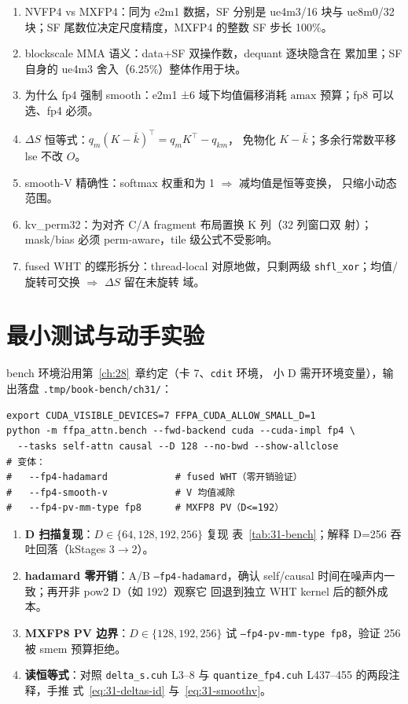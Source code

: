 \begin{enumerate}[itemsep=2pt,topsep=2pt]
  \item NVFP4 vs MXFP4：同为 e2m1 数据，SF 分别是 ue4m3/16 块与
        ue8m0/32 块；SF 尾数位决定尺度精度，MXFP4 的整数 SF 步长
        100\%。
  \item blockscale MMA 语义：data+SF 双操作数，dequant 逐块隐含在
        累加里；SF 自身的 ue4m3 舍入（6.25\%）整体作用于块。
  \item 为什么 fp4 强制 smooth：e2m1 ±6 域下均值偏移消耗
        $\mathrm{amax}$ 预算；fp8 可以选、fp4 必须。
  \item $\Delta S$ 恒等式：$q_m(K-\bar k)^\top=q_mK^\top-q_{km}$，
        免物化 $K-\bar k$；多余行常数平移 lse 不改 $O$。
  \item smooth-V 精确性：softmax 权重和为 1 $\Rightarrow$ 减均值是恒等变换，
        只缩小动态范围。
  \item kv\_perm32：为对齐 C/A fragment 布局置换 K 列（32 列窗口双
        射）；mask/bias 必须 perm-aware，tile 级公式不受影响。
  \item fused WHT 的蝶形拆分：thread-local 对原地做，只剩两级
        \texttt{shfl\_xor}；均值/旋转可交换 $\Rightarrow$ $\Delta S$ 留在未旋转
        域。
\end{enumerate}

\section{最小测试与动手实验}

bench 环境沿用第~\ref{ch:28}~章约定（卡 7、\texttt{cdit} 环境，
小 D 需开环境变量），输出落盘 \texttt{.tmp/book-bench/ch31/}：

\begin{lstlisting}[style=console]
export CUDA_VISIBLE_DEVICES=7 FFPA_CUDA_ALLOW_SMALL_D=1
python -m ffpa_attn.bench --fwd-backend cuda --cuda-impl fp4 \
  --tasks self-attn causal --D 128 --no-bwd --show-allclose
# 变体：
#   --fp4-hadamard            # fused WHT（零开销验证）
#   --fp4-smooth-v            # V 均值减除
#   --fp4-pv-mm-type fp8      # MXFP8 PV（D<=192）
\end{lstlisting}

\begin{enumerate}[itemsep=2pt,topsep=2pt]
  \item \textbf{D 扫描复现}：$D\in\{64,128,192,256\}$ 复现
        表~\ref{tab:31-bench}；解释 D=256 吞吐回落（kStages 3$\to$2）。
  \item \textbf{hadamard 零开销}：A/B \texttt{--fp4-hadamard}，确认
        self/causal 时间在噪声内一致；再开非 pow2 D（如 192）观察它
        回退到独立 WHT kernel 后的额外成本。
  \item \textbf{MXFP8 PV 边界}：$D\in\{128,192,256\}$ 试
        \texttt{--fp4-pv-mm-type fp8}，验证 256 被 smem 预算拒绝。
  \item \textbf{读恒等式}：对照 \texttt{delta\_s.cuh} L3--8 与
        \texttt{quantize\_fp4.cuh} L437--455 的两段注释，手推
        式~\ref{eq:31-deltas-id} 与~\ref{eq:31-smoothv}。
\end{enumerate}


